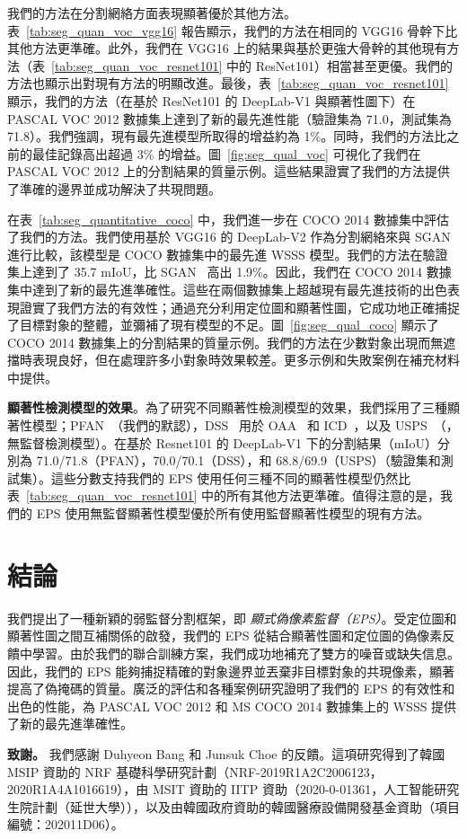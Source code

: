 \documentclass[final]{cvpr}
\begin{document}

我們的方法在分割網絡方面表現顯著優於其他方法。表~\ref{tab:seg_quan_voc_vgg16} 報告顯示，我們的方法在相同的 VGG16 骨幹下比其他方法更準確。此外，我們在 VGG16 上的結果與基於更強大骨幹的其他現有方法（\ie 表~\ref{tab:seg_quan_voc_resnet101} 中的 ResNet101）相當甚至更優。我們的方法也顯示出對現有方法的明顯改進。最後，表~\ref{tab:seg_quan_voc_resnet101} 顯示，我們的方法（在基於 ResNet101 的 DeepLab-V1 與顯著性圖下）在 PASCAL VOC 2012 數據集上達到了新的最先進性能（驗證集為 71.0，測試集為 71.8）。我們強調，現有最先進模型所取得的增益約為 1\%。同時，我們的方法比之前的最佳記錄高出超過 3\% 的增益。圖~\ref{fig:seg_qual_voc} 可視化了我們在 PASCAL VOC 2012 上的分割結果的質量示例。這些結果證實了我們的方法提供了準確的邊界並成功解決了共現問題。

在表~\ref{tab:seg_quantitative_coco} 中，我們進一步在 COCO 2014 數據集中評估了我們的方法。我們使用基於 VGG16 的 DeepLab-V2 作為分割網絡來與 SGAN~\cite{yao2020saliency} 進行比較，該模型是 COCO 數據集中的最先進 WSSS 模型。我們的方法在驗證集上達到了 35.7 mIoU，比 SGAN~\cite{yao2020saliency} 高出 1.9\%。因此，我們在 COCO 2014 數據集中達到了新的最先進準確性。這些在兩個數據集上超越現有最先進技術的出色表現證實了我們方法的有效性；通過充分利用定位圖和顯著性圖，它成功地正確捕捉了目標對象的整體，並彌補了現有模型的不足。圖~\ref{fig:seg_qual_coco} 顯示了 COCO 2014 數據集上的分割結果的質量示例。我們的方法在少數對象出現而無遮擋時表現良好，但在處理許多小對象時效果較差。更多示例和失敗案例在補充材料中提供。

\vspace{1mm}
\noindent \textbf{顯著性檢測模型的效果}。為了研究不同顯著性檢測模型的效果，我們採用了三種顯著性模型；PFAN~\cite{zhao2019pyramid}（我們的默認），DSS~\cite{hou2017deeply} 用於 OAA~\cite{jiang2019integral} 和 ICD~\cite{fan2020learning}，以及 USPS~\cite{nguyen2019deepusps}（\ie，無監督檢測模型）。在基於 Resnet101 的 DeepLab-V1 下的分割結果（mIoU）分別為 71.0/71.8（PFAN），70.0/70.1（DSS），和 68.8/69.9（USPS）（驗證集和測試集）。這些分數支持我們的 EPS 使用任何三種不同的顯著性模型仍然比表~\ref{tab:seg_quan_voc_resnet101} 中的所有其他方法更準確。值得注意的是，我們的 EPS 使用無監督顯著性模型優於所有使用監督顯著性模型的現有方法。

\section{結論}
我們提出了一種新穎的弱監督分割框架，即 \emph{顯式偽像素監督（EPS）}。受定位圖和顯著性圖之間互補關係的啟發，我們的 EPS 從結合顯著性圖和定位圖的偽像素反饋中學習。由於我們的聯合訓練方案，我們成功地補充了雙方的噪音或缺失信息。因此，我們的 EPS 能夠捕捉精確的對象邊界並丟棄非目標對象的共現像素，顯著提高了偽掩碼的質量。廣泛的評估和各種案例研究證明了我們的 EPS 的有效性和出色的性能，為 PASCAL VOC 2012 和 MS COCO 2014 數據集上的 WSSS 提供了新的最先進準確性。

\noindent\textbf{致謝。}
我們感謝 Duhyeon Bang 和 Junsuk Choe 的反饋。這項研究得到了韓國 MSIP 資助的 NRF 基礎科學研究計劃（NRF-2019R1A2C2006123，2020R1A4A1016619），由 MSIT 資助的 IITP 資助（2020-0-01361，人工智能研究生院計劃（延世大學）），以及由韓國政府資助的韓國醫療設備開發基金資助（項目編號：202011D06）。

{\small


}
\end{document}

